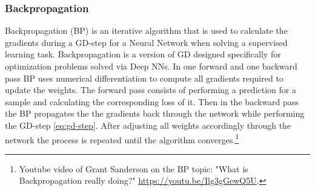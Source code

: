 \subsubsection{Backpropagation}
Backpropagation (BP) is an iterative algorithm that is used to calculate the gradients during a GD-step for a Neural Network when solving a supervised learning task.
Backpropagation is a version of GD designed specifically for optimization problems solved via Deep NNs.
In one forward and one backward pass BP uses numerical differentiation to compute all gradients required to update the weights.
The forward pass consists of performing a prediction for a sample and calculating the corresponding loss of it.
Then in the backward pass the BP propagates the the gradients back through the network while performing the GD-step \eqref{eq:gd-step}.
After adjusting all weights accordingly through the network the process is repeated until the algorithm converges.\footnote{
    Youtube video of Grant Sanderson on the BP topic: "What is Backpropagation really doing?" \url{https://youtu.be/Ilg3gGewQ5U}.
}


